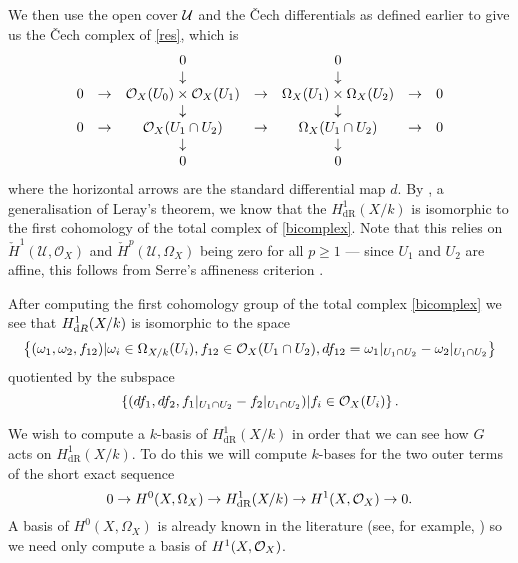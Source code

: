 \documentclass[draft, 11pt]{article} %
\theoremstyle{plain}
\theoremstyle{remark}
\newcommand{\cO}{{\cal O}}
\newcommand{\ra}{\rightarrow}
\newcommand{\cU}{{\mathcal U}}
\newcommand{\cech}{\v{C}ech }
\newcommand{\cechhone}{\check{H}^1(\mathcal U,\mathcal O_X)}
\newcommand{\derhamhone}{H_{\text {dR}}^1(X/k)}
\begin{document}
We then use the open cover $\cal U$ and the \cech differentials as defined earlier to give us the \cech complex of \eqref{res}, which is
\begin{equation}\label{bicomplex} \begin{array}{ccccccc}
~ & ~ & 0 & ~ & 0 & ~ & ~ \\
~ & ~ & \downarrow & ~ & \downarrow & ~ & ~ \\
0 & \rightarrow & \cO_X(U_0)\times \cO_X(U_1) & \rightarrow & \Omega_X(U_1)\times \Omega_X(U_2) & \rightarrow & 0 \\
~ & ~ & \downarrow & ~ & \downarrow & ~ & ~ \\
0 & \rightarrow & \cO_X(U_1 \cap U_2) & \rightarrow & \Omega_X(U_1 \cap U_2) & \rightarrow & 0 \\
~ & ~ & \downarrow & ~ & \downarrow & ~ & ~ \\
~ & ~ & 0 & ~ & 0 & ~ & ~ \\
\end{array}
\end{equation}
where the horizontal arrows are the standard differential map $d$.
By \cite[Cor. 12.4.7]{EGA0III}, a generalisation of Leray's theorem, we know that the $\derhamhone$ is isomorphic to the first cohomology of the total complex of \eqref{bicomplex}.
Note that this relies on $\cechhone$ and ${\check H}^p(\cU, \Omega_X)$ being zero for all $p\geq 1$ ---
since $U_1$ and $U_2$ are affine, this follows from Serre's affineness criterion \cite[Thm 5.2.23]{liu}.



After computing the first cohomology group of the total complex \eqref{bicomplex} we see that $H^1_{{\text dR}}(X/k)$ is isomorphic to the space
\begin{equation}\label{derhamconditions}
\left\{(\omega_1, \omega_2, f_{12}) | \omega_i\in \Omega_{X/k}(U_i), f_{12}\in \cO_X(U_1 \cap U_2), df_{12} = \omega_1|_{U_1\cap U_2} - \omega_2|_{U_1\cap U_2} \right\}
\end{equation}
quotiented by the subspace
\[
\left\{  (df_1, df_2, f_1|_{U_1\cap U_2} -f_2|_{U_1\cap U_2} )|f_i \in \cO_X(U_i)\right\}.
\]

We wish to compute a $k$-basis of $\derhamhone$ in order that we can see how $G$ acts on $\derhamhone$.
To do this we will compute $k$-bases for the two outer terms of the short exact sequence
\begin{equation}\label{ses}
0 \ra H^0(X,\Omega_X) \ra \derhamhone \ra H^1(X,\cO_X) \ra 0.
\end{equation}
A basis of $H^0(X,\Omega_X)$ is already known in the literature (see, for example, \cite[Prop. 7.4.26]{liu}) so we need only compute a basis of $H^1(X,\cO_X)$.
\end{document}
